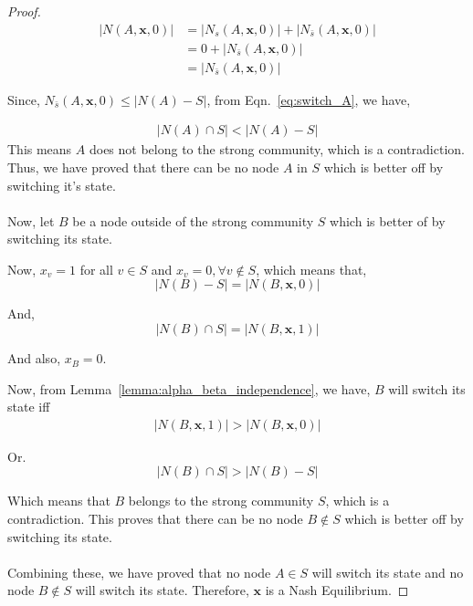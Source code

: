 \begin{lemma}
\begin{proof}
\begin{align}
|N(A, \mathbf{x},0)|  &= |N_s(A, \mathbf{x}, 0)| + |N_{\bar{s}}(A, \mathbf{x}, 0)|\\
& = 0 + |N_{\bar{s}}(A, \mathbf{x}, 0)|\\
& = |N_{\bar{s}}(A, \mathbf{x}, 0)|
\end{align}


Since, $N_{\bar{s}}(A, \mathbf{x}, 0) \leq|N(A) - S|$, from Eqn.~\ref{eq:switch_A}, we have,

\begin{align}
     |N(A) \cap S| < |N(A)- S|
\end{align}
This means $A$ does not belong to the strong community, which is a contradiction.
\\
Thus, we have proved that there can be no node $A$ in $S$ which is better off by switching it's state.
\\
\\
Now, let $B$ be a node outside of the strong community $S$ which is better of by switching its state. 


Now, $x_v=1$ for all $v\in S$ and $x_v=0, \forall{v \notin S} $, which means that,
\
\begin{equation}
|N(B) - S| = |N(B, \mathbf{x}, 0)|
\end{equation}

And,
\begin{equation}
|N(B) \cap S| = |N(B, \mathbf{x}, 1)|
\end{equation}

And also, $x_B = 0$.

Now, from Lemma~\ref{lemma:alpha_beta_independence}, we have, $B$ will switch its state iff
\begin{align}
\label{eq:switch_B}
|N(B, \mathbf{x}, 1)|  > |N(B, \mathbf{x}, 0)|
\end{align}

Or.
\begin{equation}
|N(B) \cap S| > |N(B) - S|
\end{equation}

Which means that $B$ belongs to the strong community $S$, which is a contradiction. This proves that there can be no node $B \notin S$ which is better off by switching its state.
\\
\\
Combining these, we have proved that no node $A \in S$ will switch its state and no node $B \notin S$ will switch its state. Therefore, $\mathbf{x}$ is a Nash Equilibrium. 
\end{proof}

\end{lemma}

